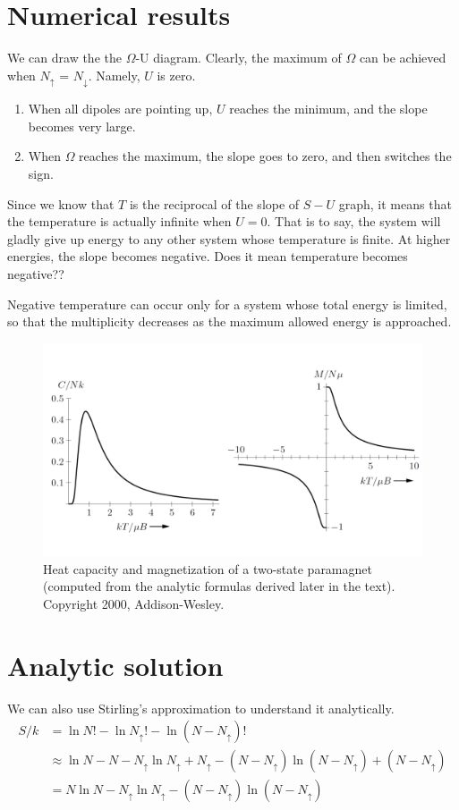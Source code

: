\section{Numerical results}

We can draw the the $\Omega$-U diagram. Clearly, the maximum of $\Omega$ can be achieved when $N_{\uparrow}$ = $N_{\downarrow}$. Namely, $U$ is zero.
\begin{enumerate}
    \item When all dipoles are pointing up, $U$ reaches the minimum, and the slope becomes very large. 
    \item When $\Omega$ reaches the maximum, the slope goes to zero, and then switches the sign.
\end{enumerate}

Since we know that $T$ is the reciprocal of the slope of $S-U$ graph, it means that the temperature is actually infinite when $U=0$. That is to say, the system will gladly give up energy to any other system whose temperature is finite. At higher energies, the slope becomes negative. Does it mean temperature becomes negative??

Negative temperature can occur only for a system whose total energy is limited, so that the multiplicity decreases as the maximum allowed energy is approached. 


\begin{figure}[ht]
    \centering
    \includegraphics[width=0.9\linewidth]{imgs/Magnetic.pdf}
    \caption{Heat capacity and magnetization of a two-state paramagnet (computed
from the analytic formulas derived later in the text). Copyright 2000,
Addison-Wesley.}
    \label{fig:results}
\end{figure}

\section{Analytic solution}
We can also use Stirling's approximation to understand it analytically.
\begin{equation} 
\begin{split}
    S/k & = \ln N! - \ln N_\uparrow ! - \ln (N-N_\uparrow)! \\
        & \approx \ln N - N - N_\uparrow \ln N_\uparrow + N_\uparrow - (N-N_\uparrow)\ln(N-N_\uparrow) + (N-N_\uparrow) \\
        & = N\ln N - N_\uparrow \ln N_\uparrow - (N-N_\uparrow) \ln(N-N_\uparrow)
\end{split}
\end{equation}


